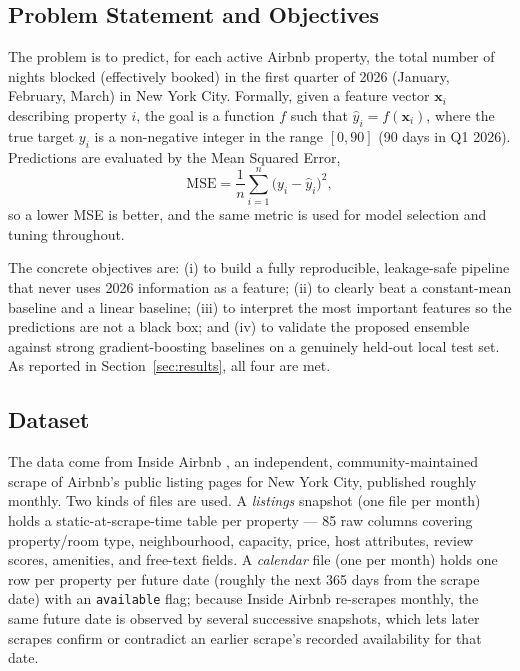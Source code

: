 \documentclass[journal]{IEEEtran}
\begin{document}
\subsection{Problem Statement and Objectives}
The problem is to predict, for each active Airbnb property, the total number of
nights blocked (effectively booked) in the first quarter of 2026 (January,
February, March) in New York City. Formally, given a feature vector
$\mathbf{x}_i$ describing property $i$, the goal is a function $f$ such that
$\hat y_i = f(\mathbf{x}_i)$, where the true target $y_i$ is a non-negative
integer in the range $[0,90]$ (90 days in Q1 2026). Predictions are evaluated
by the Mean Squared Error,
\begin{equation}
\text{MSE} = \frac{1}{n}\sum_{i=1}^{n}\big(y_i-\hat y_i\big)^{2},
\label{eq:mse}
\end{equation}
so a lower MSE is better, and the same metric is used for model selection and
tuning throughout.

The concrete objectives are: (i) to build a fully reproducible, leakage-safe
pipeline that never uses 2026 information as a feature; (ii) to clearly beat a
constant-mean baseline and a linear baseline; (iii) to interpret the most
important features so the predictions are not a black box; and (iv) to
validate the proposed ensemble against strong gradient-boosting baselines on a
genuinely held-out local test set. As reported in Section~\ref{sec:results},
all four are met.

\subsection{Dataset}
\label{sec:dataset}
The data come from Inside Airbnb \cite{insideairbnb}, an independent,
community-maintained scrape of Airbnb's public listing pages for New York
City, published roughly monthly. Two kinds of files are used. A \emph{listings}
snapshot (one file per month) holds a static-at-scrape-time table per property
--- 85 raw columns covering property/room type, neighbourhood, capacity, price,
host attributes, review scores, amenities, and free-text fields. A
\emph{calendar} file (one per month) holds one row per property per future
date (roughly the next 365 days from the scrape date) with an
\texttt{available} flag; because Inside Airbnb re-scrapes monthly, the same
future date is observed by several successive snapshots, which lets later
scrapes confirm or contradict an earlier scrape's recorded availability for
that date.
\end{document}
